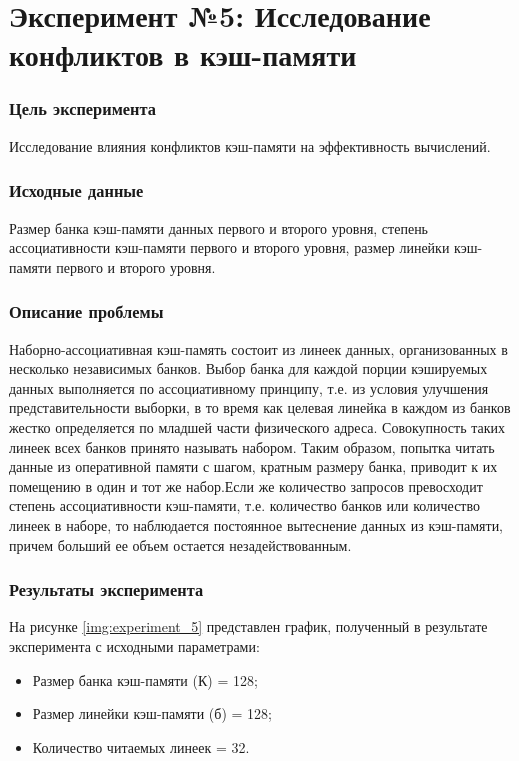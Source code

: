 \chapter*{\textbf{Эксперимент №5: Исследование конфликтов в кэш-памяти}}

\subsection*{\textbf{Цель эксперимента}}
Исследование влияния конфликтов кэш-памяти на эффективность вычислений.


\subsection*{\textbf{Исходные данные}}
Размер банка кэш-памяти данных первого и второго уровня, степень ассоциативности кэш-памяти первого и второго уровня, размер линейки кэш-памяти первого и второго уровня.

\subsection*{\textbf{Описание проблемы}}
Наборно-ассоциативная кэш-память состоит из линеек данных, организованных в несколько независимых банков. Выбор банка для каждой порции кэшируемых данных выполняется по ассоциативному принципу, т.е. из условия улучшения представительности выборки, в то время как целевая линейка в каждом из банков жестко определяется по младшей части физического адреса. Совокупность таких линеек всех банков принято называть набором. Таким образом, попытка читать данные из оперативной памяти с шагом, кратным размеру банка, приводит к их помещению в один и тот же набор.Если же количество запросов превосходит степень ассоциативности кэш-памяти, т.е. количество банков или количество линеек в наборе, то наблюдается постоянное вытеснение данных из кэш-памяти, причем больший ее объем остается незадействованным. 

\subsection*{\textbf{Результаты эксперимента}}
На рисунке \ref{img:experiment_5} представлен график, полученный в результате эксперимента с исходными параметрами:
\begin{itemize}
	\item Размер банка кэш-памяти (К) = 128;
	\item Размер линейки кэш-памяти (б) = 128;
	\item Количество читаемых линеек = 32.
\end{itemize}


